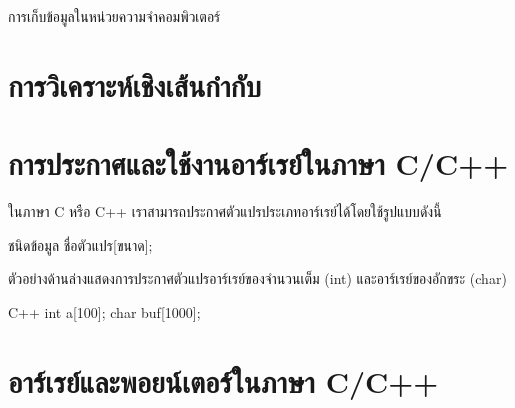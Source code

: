 การ{\wbr}เก็บ{\wbr}ข้อมูล{\wbr}ใน{\wbr}หน่วยความจำ{\wbr}คอมพิวเตอร์{\wbr}

\section{การ{\wbr}วิเคราะห์{\wbr}เชิง{\wbr}เส้น{\wbr}กำกับ}

\section{การ{\wbr}ประกาศ{\wbr}และ{\wbr}ใช้{\wbr}งาน{\wbr}อาร์เรย์{\wbr}ใน{\wbr}ภาษา C/C++}

ใน{\wbr}ภาษา C หรือ C++ เรา{\wbr}สามารถ{\wbr}ประกาศ{\wbr}ตัวแปร{\wbr}ประเภท{\wbr}อาร์เรย์{\wbr}ได้{\wbr}โดย{\wbr}ใช้{\wbr}รูปแบบ{\wbr}ดังนี้{\wbr}

\begin{center}
ชนิด{\wbr}ข้อมูล ชื่อ{\wbr}ตัวแปร[ขนาด];
\end{center}

ตัวอย่าง{\wbr}ด้าน{\wbr}ล่าง{\wbr}แสดง{\wbr}การ{\wbr}ประกาศ{\wbr}ตัวแปร{\wbr}อาร์เรย์{\wbr}ของ{\wbr}จำนวนเต็ม ({\ttt int})
และ{\wbr}อาร์เรย์{\wbr}ของ{\wbr}อักขระ ({\ttt char})

\latintext
\begin{codelist}{C++}
int a[100];
char buf[1000];
\end{codelist}
\thaitext

\section{อาร์เรย์{\wbr}และ{\wbr}พอยน์เตอร์{\wbr}ใน{\wbr}ภาษา C/C++}
\label{sect:array-pointer-c}
